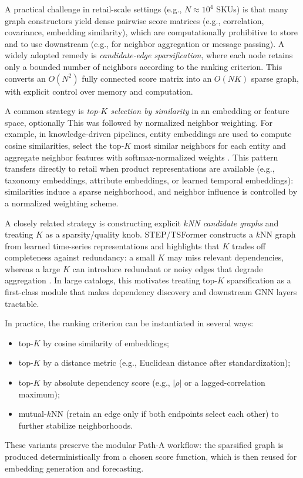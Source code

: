 A practical challenge in retail-scale settings (e.g., $N \approx 10^{4}$ SKUs) is that many graph
constructors yield dense pairwise score matrices (e.g., correlation, covariance, embedding similarity),
which are computationally prohibitive to store and to use downstream (e.g., for neighbor aggregation
or message passing). A widely adopted remedy is \emph{candidate-edge sparsification}, where each node
retains only a bounded number of neighbors according to the ranking criterion. This converts an
$O(N^{2})$ fully connected score matrix into an $O(NK)$ sparse graph, with explicit control over memory
and computation.

A common strategy is \emph{top-$K$ selection by similarity} in an embedding or feature space, optionally
This was followed by normalized neighbor weighting. For example, in knowledge-driven pipelines, entity
embeddings are used to compute cosine similarities, select the top-$K$ most similar neighbors for each
entity and aggregate neighbor features with softmax-normalized weights \cite{9763825}. This pattern
transfers directly to retail when product representations are available (e.g., taxonomy embeddings,
attribute embeddings, or learned temporal embeddings): similarities induce a sparse neighborhood,
and neighbor influence is controlled by a normalized weighting scheme.

A closely related strategy is constructing explicit \emph{$k$NN candidate graphs} and treating $K$ as a
sparsity/quality knob. STEP/TSFormer constructs a $k$NN graph from learned time-series
representations and highlights that $K$ trades off completeness against redundancy: a small $K$ may
miss relevant dependencies, whereas a large $K$ can introduce redundant or noisy edges that degrade
aggregation \cite{10.1145/3534678.3539396}. In large catalogs, this motivates treating top-$K$
sparsification as a first-class module that makes dependency discovery and downstream GNN layers
tractable.

In practice, the ranking criterion can be instantiated in several ways:
\begin{itemize}
    \item top-$K$ by cosine similarity of embeddings;
    \item top-$K$ by a distance metric (e.g., Euclidean distance after standardization);
    \item top-$K$ by absolute dependency score (e.g., $|\rho|$ or a lagged-correlation maximum);
    \item mutual-$k$NN (retain an edge only if both endpoints select each other) to further stabilize neighborhoods.
\end{itemize}
These variants preserve the modular Path-A workflow: the sparsified graph is produced deterministically
from a chosen score function, which is then reused for embedding generation and forecasting.




